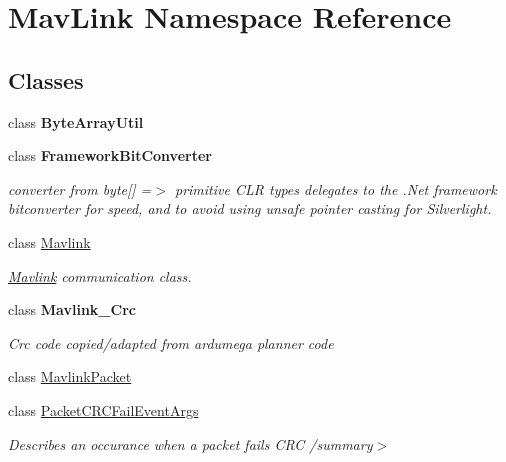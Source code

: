 \hypertarget{namespaceMavLink}{}\section{Mav\+Link Namespace Reference}
\label{namespaceMavLink}
\subsection*{Classes}
\begin{DoxyCompactItemize}
\item 
class {\bfseries Byte\+Array\+Util}
\item 
class {\bfseries Framework\+Bit\+Converter}
\begin{DoxyCompactList}\small\item\em converter from byte\mbox{[}\mbox{]} =$>$ primitive C\+LR types delegates to the .Net framework bitconverter for speed, and to avoid using unsafe pointer casting for Silverlight. \end{DoxyCompactList}\item 
class \mbox{\hyperlink{classMavLink_1_1Mavlink}{Mavlink}}
\begin{DoxyCompactList}\small\item\em \mbox{\hyperlink{classMavLink_1_1Mavlink}{Mavlink}} communication class. \end{DoxyCompactList}\item 
class {\bfseries Mavlink\+\_\+\+Crc}
\begin{DoxyCompactList}\small\item\em Crc code copied/adapted from ardumega planner code \end{DoxyCompactList}\item 
class \mbox{\hyperlink{classMavLink_1_1MavlinkPacket}{Mavlink\+Packet}}
\item 
class \mbox{\hyperlink{classMavLink_1_1PacketCRCFailEventArgs}{Packet\+C\+R\+C\+Fail\+Event\+Args}}
\begin{DoxyCompactList}\small\item\em Describes an occurance when a packet fails C\+RC /summary$>$ \end{DoxyCompactList}\end{DoxyCompactItemize}
